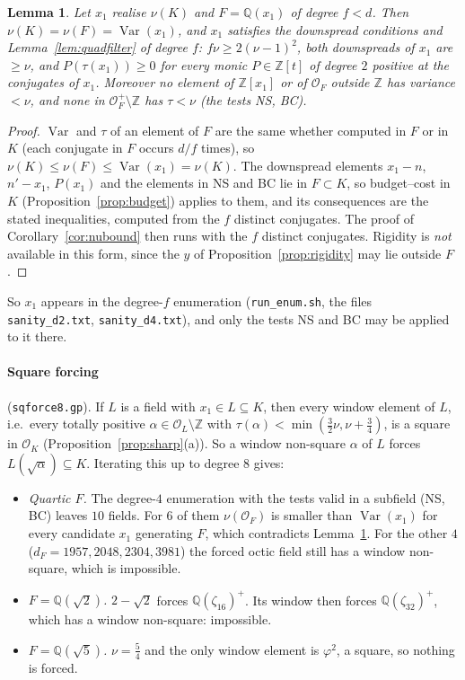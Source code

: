 \documentclass[11pt]{amsart}
\newtheorem{lemma}[theorem]{Lemma}
\theoremstyle{definition}
\DeclareMathOperator{\Var}{Var}
\newcommand{\OK}{\mathcal{O}_K}
\newcommand{\Q}{\mathbb{Q}}
\newcommand{\Z}{\mathbb{Z}}
\newcommand{\file}[1]{\texttt{#1}}
\begin{document}
\begin{lemma}\label{lem:subenum}
Let $x_1$ realise $\nu(K)$ and $F=\Q(x_1)$ of degree $f<d$.  Then $\nu(K)=\nu(F)=\Var(x_1)$,
and $x_1$ satisfies the downspread conditions and Lemma~\ref{lem:quadfilter} of degree $f$:
$f\nu\ge2(\nu-1)^2$, both downspreads of $x_1$ are $\ge\nu$, and $P(\tau(x_1))\ge0$ for every
monic $P\in\Z[t]$ of degree $2$ positive at the conjugates of $x_1$.  Moreover no element
of $\Z[x_1]$ or of $\mathcal O_F$ outside $\Z$ has variance $<\nu$, and none in
$\mathcal O_F^+\setminus\Z$ has $\tau<\nu$ (the tests NS, BC).
\end{lemma}

\begin{proof}
$\Var$ and $\tau$ of an element of $F$ are the same whether computed in $F$ or in $K$ (each
conjugate in $F$ occurs $d/f$ times), so $\nu(K)\le\nu(F)\le\Var(x_1)=\nu(K)$.  The
downspread elements $x_1-n$, $n'-x_1$, $P(x_1)$ and the elements in NS and BC lie in $F\subset K$,
so budget--cost in $K$ (Proposition~\ref{prop:budget}) applies to them, and its
consequences are the stated inequalities, computed from the $f$ distinct conjugates.  The
proof of Corollary~\ref{cor:nubound} then runs with the $f$ distinct conjugates.
Rigidity is \emph{not} available in this form, since the $y$ of
Proposition~\ref{prop:rigidity} may lie outside $F$.
\end{proof}

So $x_1$ appears in the degree-$f$ enumeration (\file{run\_enum.sh}, the files
\file{sanity\_d2.txt}, \file{sanity\_d4.txt}), and only the tests NS and BC may be applied
to it there.

\paragraph{Square forcing} (\file{sqforce8.gp}).  If $L$ is a field with $x_1\in L\subseteq K$,
then every window element of $L$, i.e.\ every totally positive $\alpha\in\mathcal O_L\setminus\Z$ with
$\tau(\alpha)<\min(\frac32\nu,\nu+\frac34)$, is a square in $\OK$
(Proposition~\ref{prop:sharp}(a)).  So a window non-square $\alpha$ of $L$ forces
$L(\sqrt\alpha)\subseteq K$.  Iterating this up to degree $8$ gives:
\begin{itemize}[leftmargin=*]
\item \emph{Quartic $F$.}  The degree-$4$ enumeration with the tests valid in a subfield (NS, BC)
  leaves $10$ fields.  For $6$ of them $\nu(\mathcal O_F)$ is smaller than $\Var(x_1)$ for every
  candidate $x_1$ generating $F$, which contradicts Lemma~\ref{lem:subenum}.  For the other $4$ ($d_F=1957,2048,2304,3981$) the forced
  octic field still has a window non-square, which is impossible.
\item \emph{$F=\Q(\sqrt2)$.}  $2-\sqrt2$ forces $\Q(\zeta_{16})^+$.  Its window then forces
  $\Q(\zeta_{32})^+$, which has a window non-square: impossible.
\item \emph{$F=\Q(\sqrt5)$.}  $\nu=\frac54$ and the only window element is
  $\varphi^2$, a square, so nothing is forced.
\end{itemize}
\end{document}
